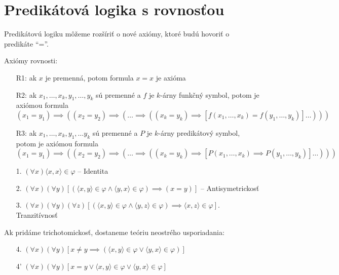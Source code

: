 \section{Predikátová logika s rovnosťou}

Predikátovú logiku môžeme rozšíriť o nové axiómy, ktoré budú
hovoriť o predikáte ``=''.

\par{Axiómy rovnosti:}
\noindent
\begin{itemize}
    \item[R1:] ak $x$ je premenná, potom formula $x=x$ je axióma
    \item[R2:] ak $x_1,\dots,x_k, y_1, \dots, y_k$ sú premenné a 
        $f$ je $k$-árny funkčný symbol, potom je axiómou formula
        \begin{equation*}
            (x_1 = y_1) \implies ( (x_2 = y_2) \implies ( \dots
                \implies ((x_k = y_k) \implies
                    [f(x_1,\dots,x_k) = f(y_1,\dots,y_k)] \dots )))
        \end{equation*}
    \item[R3:] ak $x_1,\dots,x_k, y_1, \dots y_k$ sú premenné a 
        $P$ je $k$-árny predikátový symbol, potom je axiómou formula
        \begin{equation*}
            (x_1 = y_1) \implies ( (x_2 = y_2) \implies ( \dots
                \implies ((x_k = y_k) \implies
                    [P(x_1,\dots,x_k) \implies P(y_1,\dots,y_k)] \dots )))
        \end{equation*}
\end{itemize}

\begin{priklad}
\noindent
    \begin{itemize}
        \item[1.] $(\forall x) \langle x,x\rangle \in \varphi$ -- Identita

        \item[2.] $(\forall x) (\forall y) [
            (\langle x,y \rangle \in \varphi \land
             \langle y,x \rangle \in \varphi) \implies (x=y)]$ -- 
             Antisymetrickosť

        \item[3.] $(\forall x) (\forall y) (\forall z)
            [( \langle x,y \rangle \in \varphi \land 
               \langle y,z \rangle \in \varphi) \implies
               \langle x,z \rangle \in \varphi]$. Tranzitívnosť
    \end{itemize}
    Ak pridáme trichotomickosť, dostaneme teóriu neostrého
    usporiadania:
    \begin{itemize}
        \item[4.] $(\forall x) (\forall y) [x \not=y \implies
            (\langle x,y \rangle \in \varphi \lor 
             \langle y,x \rangle \in \varphi)]$

        \item[4'] $(\forall x) (\forall y) [x = y \lor
             \langle x,y \rangle \in \varphi \lor 
             \langle y,x \rangle \in \varphi]$
    \end{itemize}
\end{priklad}

